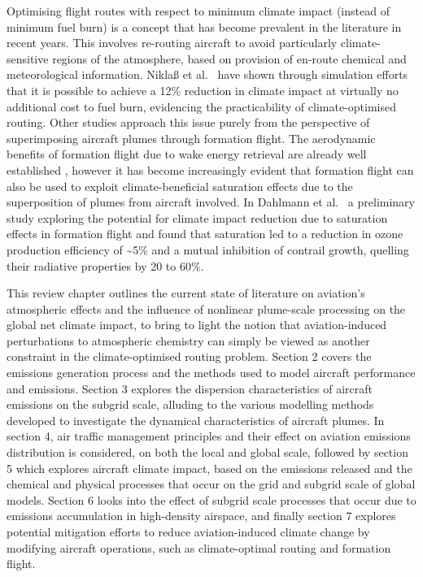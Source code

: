 Optimising flight routes with respect to minimum climate impact (instead of minimum fuel burn) is a concept that has become prevalent in the literature in recent years. This involves re-routing aircraft to avoid particularly climate-sensitive regions of the atmosphere, based on provision of en-route chemical and meteorological information. Nikla{\ss} et al.\ \cite{Niklass2019a} have shown through simulation efforts that it is possible to achieve a 12\% reduction in climate impact at virtually no additional cost to fuel burn, evidencing the practicability of climate-optimised routing. Other studies approach this issue purely from the perspective of superimposing aircraft plumes through formation flight. The aerodynamic benefits of formation flight due to wake energy retrieval are already well established \cite{Bangash2004, Kent2020}, however it has become increasingly evident that formation flight can also be used to exploit climate-beneficial saturation effects due to the superposition of plumes from aircraft involved. In Dahlmann et al.\ \cite{Dahlmann2020} a preliminary study exploring the potential for climate impact reduction due to saturation effects in formation flight and found that  saturation led to a reduction in ozone production efficiency of \textasciitilde5\% and a mutual inhibition of contrail growth, quelling their radiative properties by 20 to 60\%. 

This review chapter outlines the current state of literature on aviation's atmospheric effects and the influence of nonlinear plume-scale processing on the global net climate impact, to bring to light the notion that aviation-induced perturbations to atmospheric chemistry can simply be viewed as another constraint in the climate-optimised routing problem. Section 2 covers the emissions generation process and the methods used to model aircraft performance and emissions. Section 3 explores the dispersion characteristics of aircraft emissions on the subgrid scale, alluding to the various modelling methods developed to investigate the dynamical characteristics of aircraft plumes. In section 4, air traffic management principles and their effect on aviation emissions distribution is considered, on both the local and global scale, followed by section 5 which explores aircraft climate impact, based on the emissions released and the chemical and physical processes that occur on the grid and subgrid scale of global models. Section 6 looks into the effect of subgrid scale processes that occur due to emissions accumulation in high-density airspace, and finally section 7 explores potential mitigation efforts to reduce aviation-induced climate change by modifying aircraft operations, such as climate-optimal routing and formation flight.